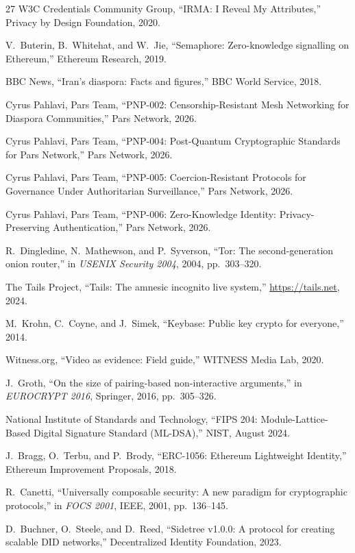 \documentclass[11pt,a4paper]{article}
\begin{document}
\begin{thebibliography}{27}
W3C Credentials Community Group,
``IRMA: I Reveal My Attributes,''
Privacy by Design Foundation, 2020.

V.~Buterin, B.~Whitehat, and W.~Jie,
``Semaphore: Zero-knowledge signalling on Ethereum,''
Ethereum Research, 2019.

BBC News,
``Iran's diaspora: Facts and figures,''
BBC World Service, 2018.

Cyrus Pahlavi, Pars Team,
``PNP-002: Censorship-Resistant Mesh Networking for Diaspora Communities,''
Pars Network, 2026.

Cyrus Pahlavi, Pars Team,
``PNP-004: Post-Quantum Cryptographic Standards for Pars Network,''
Pars Network, 2026.

Cyrus Pahlavi, Pars Team,
``PNP-005: Coercion-Resistant Protocols for Governance Under Authoritarian Surveillance,''
Pars Network, 2026.

Cyrus Pahlavi, Pars Team,
``PNP-006: Zero-Knowledge Identity: Privacy-Preserving Authentication,''
Pars Network, 2026.

R.~Dingledine, N.~Mathewson, and P.~Syverson,
``Tor: The second-generation onion router,''
in \emph{USENIX Security 2004}, 2004, pp.~303--320.

The Tails Project,
``Tails: The amnesic incognito live system,''
\url{https://tails.net}, 2024.

M.~Krohn, C.~Coyne, and J.~Simek,
``Keybase: Public key crypto for everyone,''
2014.

Witness.org,
``Video as evidence: Field guide,''
WITNESS Media Lab, 2020.

J.~Groth,
``On the size of pairing-based non-interactive arguments,''
in \emph{EUROCRYPT 2016}, Springer, 2016, pp.~305--326.

National Institute of Standards and Technology,
``FIPS 204: Module-Lattice-Based Digital Signature Standard (ML-DSA),''
NIST, August 2024.

J.~Bragg, O.~Terbu, and P.~Brody,
``ERC-1056: Ethereum Lightweight Identity,''
Ethereum Improvement Proposals, 2018.

R.~Canetti,
``Universally composable security: A new paradigm for cryptographic protocols,''
in \emph{FOCS 2001}, IEEE, 2001, pp.~136--145.

D.~Buchner, O.~Steele, and D.~Reed,
``Sidetree v1.0.0: A protocol for creating scalable DID networks,''
Decentralized Identity Foundation, 2023.

\end{thebibliography}
\end{document}
